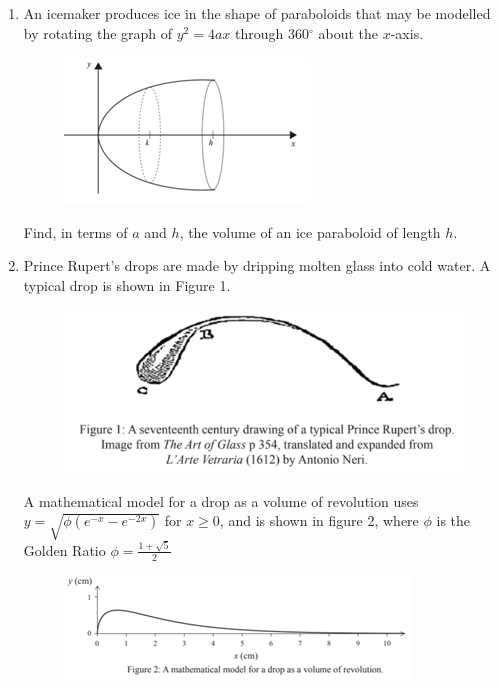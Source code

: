 \documentclass[../main.tex]{subfiles}
\begin{document}
\begin{enumerate}[itemsep=0.7cm]
    \pagebreak
    \item 
    An icemaker produces ice in the shape of paraboloids that may be modelled by rotating the graph of $y^2=4ax$ through 360$^{\circ}$ about the $x$-axis.

    \begin{figure}[h]
        \centering
        \includegraphics{images/volrev16.png}
    \end{figure}

    Find, in terms of $a$ and $h$, the volume of an ice paraboloid of length $h$.

    \item 
    Prince Rupert’s drops are made by dripping molten glass into cold water. A typical drop is shown in Figure 1.

    \begin{figure}[h]
        \centering
        \includegraphics{images/volrev17.png}
    \end{figure}

    A mathematical model for a drop as a volume of revolution uses $y=\sqrt{\phi(e^{-x}-e^{-2x})}$ for $x\geq 0$, and is shown in figure 2, where $\phi$ is the Golden Ratio $\phi=\frac{1+\sqrt{5}}{2}$

    \begin{figure}[h]
        \centering
        \includegraphics{images/volrev18.png}
    \end{figure}


\end{enumerate}
\end{document}
